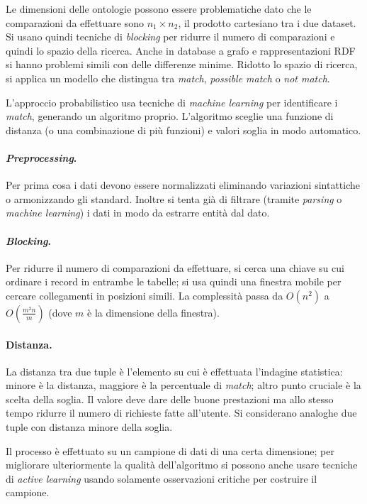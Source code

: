 \documentclass[11pt]{article}
\begin{document}
Le dimensioni delle ontologie possono essere problematiche dato che le comparazioni da effettuare sono $n_1 \times n_2$, il prodotto cartesiano tra i due dataset.
Si usano quindi tecniche di \textit{blocking} per ridurre il numero di comparazioni e quindi lo spazio della ricerca.
Anche in database a grafo e rappresentazioni RDF si hanno problemi simili con delle differenze minime.
Ridotto lo spazio di ricerca, si applica un modello che distingua tra \textit{match}, \textit{possible match} o \textit{not match}.

L'approccio probabilistico usa tecniche di \textit{machine learning} per identificare i \textit{match}, generando un algoritmo proprio.
L'algoritmo sceglie una funzione di distanza (o una combinazione di più funzioni) e valori soglia in modo automatico.

\paragraph{\textit{Preprocessing}.}
Per prima cosa i dati devono essere normalizzati eliminando variazioni sintattiche o armonizzando gli standard.
Inoltre si tenta già di filtrare (tramite \textit{parsing} o \textit{machine learning}) i dati in modo da estrarre entità dal dato.

\paragraph{\textit{Blocking}.}
Per ridurre il numero di comparazioni da effettuare, si cerca una chiave su cui ordinare i record in entrambe le tabelle; si usa quindi una finestra mobile per cercare collegamenti in posizioni simili.
La complessità passa da $O(n^2)$ a $O(\frac{m^2n}{m})$ (dove $m$ è la dimensione della finestra).

\paragraph{Distanza.}
La distanza tra due tuple è l'elemento su cui è effettuata l'indagine statistica: minore è la distanza, maggiore è la percentuale di \textit{match}; altro punto cruciale è la scelta della soglia.
Il valore deve dare delle buone prestazioni ma allo stesso tempo ridurre il numero di richieste fatte all'utente.
Si considerano analoghe due tuple con distanza minore della soglia.
\newline

Il processo è effettuato su un campione di dati di una certa dimensione; per migliorare ulteriormente la qualità dell'algoritmo si possono anche usare tecniche di \textit{active learning} usando solamente osservazioni critiche per costruire il campione.
\end{document}
